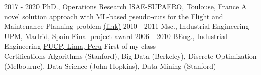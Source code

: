 \documentclass[letterpaper]{twentysecondcv} %
\begin{document}
\begin{twenty} %
  \twentyitemshorttest
      {2017 - 2020}
        {}
        {PhD., Operations Research}
        {\href{https://www.isae-supaero.fr/en/}{ISAE-SUPAERO, Toulouse, France}}
        {A novel solution approach with ML-based pseudo-cuts for the Flight and Maintenance Planning problem \href{https://link.springer.com/article/10.1007/s00291-020-00591-z}{(link)}}
  \twentyitemshorttest
      {2010 - 2011}
    {}
        {Msc., Industrial Engineering}
        {\href{https://www.upm.es/internacional}{UPM, Madrid, Spain}}
        {Final project award}
  \twentyitemshorttest
      {2006 - 2010}
    {}
        {BEng., Industrial Engineering}
        {\href{https://www.pucp.edu.pe/}{PUCP, Lima, Peru}}
        {First of my class}
  \\
  \twentyitemshorttest
      {Certifications}
    {}
        {Algorithms (Stanford), Big Data (Berkeley), Discrete Optimization (Melbourne), Data Science (John Hopkins), Data Mining (Stanford)}
        {}
        {}

\end{twenty}
\end{document}
